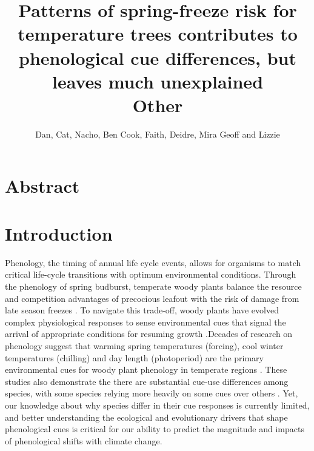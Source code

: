 \documentclass[12pt]{article}
\title{
Patterns of spring-freeze risk for temperature trees contributes to phenological cue differences, but leaves much unexplained\\
Other
}
\author{Dan, Cat, Nacho, Ben Cook, Faith, Deidre, Mira Geoff and Lizzie}
\begin{document}

\maketitle

\section*{Abstract}
\section*{Introduction}

Phenology, the timing of annual life cycle events, allows for organisms to match critical life-cycle transitions with optimum environmental conditions. Through the phenology of spring budburst, temperate woody plants balance the resource and competition advantages of precocious leafout with the risk of damage from late season freezes \citep{Savage:2013aa}. To navigate this trade-off, woody plants have evolved complex physiological responses to sense environmental cues that signal the arrival of appropriate conditions for resuming growth \citep{Polgar2011}.Decades of research on phenology  suggest that warming spring temperatures (forcing), cool winter temperatures (chilling) and day length (photoperiod) are the primary environmental cues for woody plant phenology in temperate regions \citep{Ettinger:2020aa,Forrest2010}. These studies also demonstrate the there are substantial cue-use differences among species, with some species relying more heavily on some cues over others \citep{Laube:2014aa,Pau2011}. Yet, our knowledge about why species differ in their cue responses is currently limited, and better understanding the ecological and evolutionary drivers that shape phenological cues is critical for our ability to predict the magnitude and impacts of phenological shifts with climate change.
\end{document}
